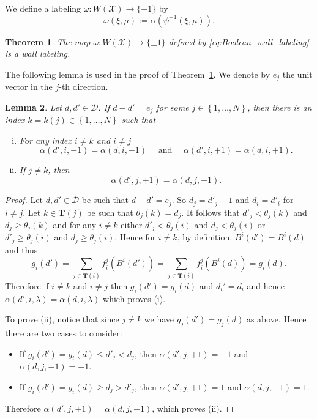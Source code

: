 \documentclass[12pt, notitlepage]{amsart}
\newcommand{\setof}[1]{\left\{ {#1}\right\}}
\newcommand{\cD}{\mathcal{D}}
\newcommand{\cX}{{\mathcal X}}
\newtheorem{thm}{Theorem}[section]
\newtheorem{lem}[thm]{Lemma}
\theoremstyle{definition}
\newcommand{\Targets}{\mathbf{T}}
\begin{document}
  We define a labeling $\omega \colon W(\cX) \to \{ \pm 1\}$ by
  \begin{equation}
    \label{eq:Boolean_wall_labeling}
    \omega (\xi, \mu) := \alpha(\psi^{-1}(\xi, \mu)).
  \end{equation}

  \begin{thm}
    \label{thm:Boolen_wall_label}
    The map $\omega \colon W(\cX) \to \{ \pm 1\}$ defined by \eqref{eq:Boolean_wall_labeling} is a wall labeling.
  \end{thm}

  The following lemma is used in the proof of Theorem~\ref{thm:Boolen_wall_label}. We denote by $e_j$ the unit vector in the $j$-th direction.

  \begin{lem}
    \label{lem:labeling}
    Let $d, d' \in \cD$. If $d - d'= e_j$ for some $j \in \setof{1, \ldots, N}$, then there is an index $k = k(j) \in \setof{1, \ldots, N}$ such that
    \begin{enumerate}[(i)]
      \item For any index $i \neq k$ and $i \neq j$
        \[
          \alpha(d', i, -1) = \alpha(d, i, -1) \quad \text{ and } \quad \alpha(d', i, +1) = \alpha(d, i, +1).
        \]
      \item If $j \neq k$, then
        \[
          \alpha(d', j, +1) = \alpha(d, j, -1).
        \]
    \end{enumerate}
  \end{lem}

  \begin{proof}
    Let $d,d' \in \cD$ be such that $d - d' = e_j$. So $d_j = d'_j + 1$ and $d_i = d'_i$ for $i \neq j$.
    Let $k \in \Targets(j)$ be such that $\theta_j(k) = d_j$. It follows that $d'_j < \theta_j(k)$ and $d_j \geq \theta_j(k)$ and for any $i \neq k$ either $d'_j < \theta_j(i)$ and $d_j < \theta_j(i)$ or $d'_j \geq \theta_j(i)$ and $d_j \geq \theta_j(i)$. Hence for $i \neq k$, by definition, $B^i(d') = B^i(d)$ and thus
    \[
      g_i(d') = \sum_{j \in \Targets(i)} f_i^j(B^i(d')) = \sum_{j \in \Targets(i)} f_i^j(B^i(d)) = g_i(d).
    \]
    Therefore if $i \neq k$ and $i \neq j$ then $g_i(d') = g_i(d)$ and $d_i' = d_i$ and hence $\alpha(d', i, \lambda) = \alpha(d, i, \lambda)$ which proves (i).

    To prove (ii), notice that since $j \neq k$ we have $g_j(d') = g_j(d)$ as above. Hence there are two cases to consider:
    \begin{itemize}
      \item If $g_i(d') = g_i(d) \leq d'_j < d_j$, then $\alpha(d', j, +1) = -1$ and $\alpha(d, j, -1) = -1$.
      \item If $g_i(d') = g_i(d) \geq d_j > d'_j$, then $\alpha(d', j, +1) = 1$ and $\alpha(d, j, -1) = 1$.
    \end{itemize}
    Therefore $\alpha(d', j, +1) = \alpha(d, j, -1)$, which proves (ii).
  \end{proof}
\end{document}
